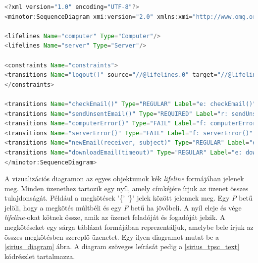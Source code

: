 \begin{lstlisting}[language=java, frame=single, float=ht!, caption={Szcenárió diagram xml leírása.},captionpos=b, label=sirius_xml]
<?xml version="1.0" encoding="UTF-8"?>
<minotor:SequenceDiagram xmi:version="2.0" xmlns:xmi="http://www.omg.org/XMI" xmlns:minotor="hu.bme.mit.mdsd.xboyz.erdiagram" Name="Email">

<lifelines Name="computer" Type="Computer"/>
<lifelines Name="server" Type="Server"/>

<constraints Name="constraints">
<transitions Name="logout()" source="//@lifelines.0" target="//@lifelines.1"/>
</constraints>

<transitions Name="checkEmail()" Type="REGULAR" Label="e: checkEmail()" source="//@lifelines.0" target="//@lifelines.0"  after="//@transitions.1" reset="x"/>
<transitions Name="sendUnsentEmail()" Type="REQUIRED" Label="r: sendUnsentEmail()" source="//@lifelines.0" target="//@lifelines.1" before="//@transitions.0" after="//@transitions.2"/>
<transitions Name="computerError()" Type="FAIL" Label="f: computerError()" source="//@lifelines.1" target="//@lifelines.0" before="//@transitions.1" after="//@transitions.3"/>
<transitions Name="serverError()" Type="FAIL" Label="f: serverError()" source="//@lifelines.0" target="//@lifelines.1" before="//@transitions.2" after="//@transitions.4"/>
<transitions Name="newEmail(receiver, subject)" Type="REGULAR" Label="e: newEmail(receiver, subject)" source="//@lifelines.0" target="//@lifelines.1" before="//@transitions.3" after="//@transitions.5" constraint="//@constraints.0" constraintType="PAST"/>
<transitions Name="downloadEmail(timeout)" Type="REGULAR" Label="e: downloadEmail(timeout)" source="//@lifelines.0" target="//@lifelines.1" before="//@transitions.4"   clockConstraint="x &gt; 10"/>
</minotor:SequenceDiagram>
\end{lstlisting}

A vizualizációs diagramon az egyes objektumok kék \textit{lifeline} formájában jelenek meg.
Minden üzenethez tartozik egy nyíl, amely címkéjére írjuk az üzenet összes tulajdonságát.
Például a megkötések '\{' '\}' jelek között jelennek meg.
Egy \textit{P} betű jelöli, hogy a megkötés múltbéli és egy \textit{F} betű ha jövőbeli.
A nyíl eleje és vége \textit{lifeline}-okat kötnek össze, amik az üzenet feladóját és fogadóját jelzik.
A megkötéseket egy sárga táblázat formájában reprezentáljuk, amelybe bele írjuk az összes megkötésben szereplő üzenetet.
Egy ilyen diagramot mutat be a \ref{sirius_diagram} ábra.
A diagram szöveges leírását pedig a \ref{sirius_tpsc_text} kódrészlet tartalmazza.


